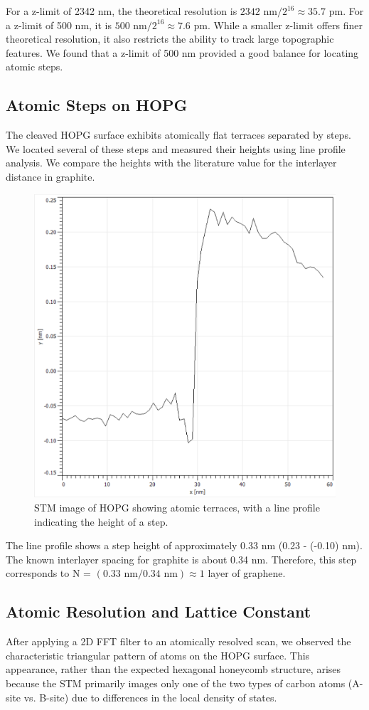 \documentclass[12pt,a4paper]{article}
\begin{document}
For a z-limit of 2342 nm, the theoretical resolution is \(2342 \text{ nm} / 2^{16} \approx 35.7 \text{ pm}\). For a z-limit of 500 nm, it is \(500 \text{ nm} / 2^{16} \approx 7.6 \text{ pm}\). While a smaller z-limit offers finer theoretical resolution, it also restricts the ability to track large topographic features. We found that a z-limit of 500 nm provided a good balance for locating atomic steps.

\subsection{Atomic Steps on HOPG}
The cleaved HOPG surface exhibits atomically flat terraces separated by steps. We located several of these steps and measured their heights using line profile analysis. We compare the heights with the literature value for the interlayer distance in graphite.

\begin{figure}[H]
    \centering
    \includegraphics[width=0.7\linewidth]{../data/tasks/2/graph.PNG}
    \caption{STM image of HOPG showing atomic terraces, with a line profile indicating the height of a step.}
    \label{fig:step}
\end{figure}
The line profile shows a step height of approximately 0.33 nm (0.23 - (-0.10) nm). The known interlayer spacing for graphite is about 0.34 nm. Therefore, this step corresponds to N = $(0.33 \text{ nm} / 0.34 \text{ nm}) \approx 1$ layer of graphene.

\subsection{Atomic Resolution and Lattice Constant}
After applying a 2D FFT filter to an atomically resolved scan, we observed the characteristic triangular pattern of atoms on the HOPG surface. This appearance, rather than the expected hexagonal honeycomb structure, arises because the STM primarily images only one of the two types of carbon atoms (A-site vs. B-site) due to differences in the local density of states.
\end{document}
